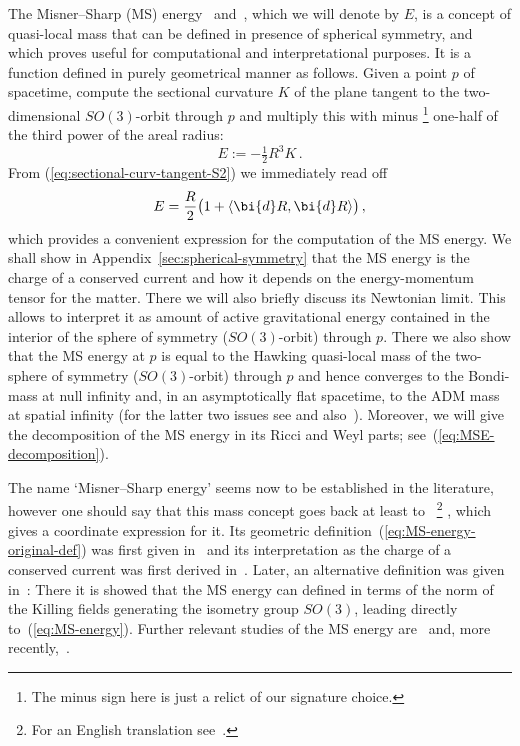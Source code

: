\documentclass
[rmp,aps,twocolumn,showpacs,preprintnumbers,amsmath,amssymb]{revtex4}
\theoremstyle{plain}
\theoremstyle{definition}
\theoremstyle{remark}
\newcommand{\sprod}[2]{\langle#1,#2\rangle}   %
\newcommand{\ed}{\bi{d}}                      %
\begin{document}
The Misner--Sharp (MS) energy~\cite{Misner.Sharp:1964} 
and~\cite{Hernandez.Misner:1966}, which we will denote by $E$, 
is a concept of quasi-local mass that can be defined in presence of 
spherical symmetry, and which proves useful for computational and 
interpretational purposes. It is a function defined in purely 
geometrical manner as follows. Given a point $p$ of spacetime, 
compute the sectional curvature $K$ of the plane tangent to the 
two-dimensional $SO(3)$-orbit through $p$ and multiply this with minus%
\footnote{The minus sign here is just a relict of our signature 
choice.} one-half of the third power of the areal radius: 
%
\begin{equation}\label{eq:MS-energy-original-def}
  E := -\tfrac{1}{2} R^3 K \,.
\end{equation}
%
From (\ref{eq:sectional-curv-tangent-S2}) we immediately read 
off 
%
\begin{equation}\label{eq:MS-energy}
  E = \frac{R}{2} \big( 1 + \sprod{\ed R}{\ed R} \big) \,,
\end{equation}
%
which provides a convenient expression for the computation of the MS 
energy. We shall show in Appendix~\ref{sec:spherical-symmetry} that 
the MS energy is the charge of a conserved current and how it depends on the 
energy-momentum tensor for the matter. There we will also briefly discuss
its Newtonian limit. This allows 
to interpret it as amount of active gravitational energy contained in the 
interior of the sphere of symmetry ($SO(3)$-orbit) through $p$. There we 
also show that the MS energy at $p$ is equal to the Hawking quasi-local 
mass of the two-sphere of symmetry ($SO(3)$-orbit) through $p$ and hence 
converges to the Bondi-mass at null infinity and, in an asymptotically 
flat spacetime, to the ADM mass at spatial infinity (for the latter two 
issues see \cite{SzabadosLivingReviews:2004} and also~\cite{Hayward:1996}). 
Moreover, we will give the decomposition of the MS energy in its Ricci and 
Weyl parts; see~(\ref{eq:MSE-decomposition}). 

The name `Misner--Sharp energy' seems now to be established in the 
literature, however one should say that this mass concept goes back at 
least to~\cite{Lemaitre:1933}%
\footnote{For an English translation see~\cite{Lemaitre:1933trad}.}%
, which gives a coordinate expression for it. Its 
geometric definition~(\ref{eq:MS-energy-original-def}) was first given 
in~\cite{Hernandez.Misner:1966} and its interpretation as the charge of a 
conserved current was first derived in~\cite{Kodama:1980}. Later, an 
alternative definition was given in~\cite{Zannias:1990}: There it is showed 
that the MS energy can defined in terms of the norm of the Killing 
fields generating the isometry group $SO(3)$, leading directly 
to~(\ref{eq:MS-energy}). Further relevant studies of the MS energy 
are~\cite{Cahill.McVittie:1970a,Cahill.McVittie:1970b} and, more 
recently,~\cite{Hayward:1996,Hayward:1998,Burnett:1991}.
\end{document}
